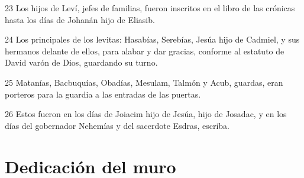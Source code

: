 \par 23 Los hijos de Leví, jefes de familias, fueron inscritos en el libro de las crónicas hasta los días de Johanán hijo de Eliasib.
\par 24 Los principales de los levitas: Hasabías, Serebías, Jesúa hijo de Cadmiel, y sus hermanos delante de ellos, para alabar y dar gracias, conforme al estatuto de David varón de Dios, guardando su turno.
\par 25 Matanías, Bacbuquías, Obadías, Mesulam, Talmón y Acub, guardas, eran porteros para la guardia a las entradas de las puertas.
\par 26 Estos fueron en los días de Joiacim hijo de Jesúa, hijo de Josadac, y en los días del gobernador Nehemías y del sacerdote Esdras, escriba.

\section*{Dedicación del muro}

